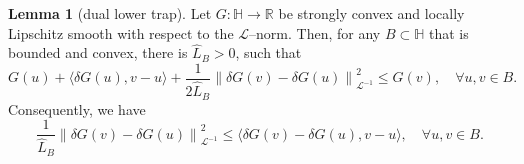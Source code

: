 \documentclass{amsart}
\newcommand{\dG}{{\delta G}}
\newcommand{\LL}{\mathcal{L}}
\newcommand{\LLinv}{{\mathcal{L}^{-1}}}
\newcommand{\norm}[2]{\left\| #1 \right\| _{#2}}
\newcommand{\pairing}[2]{\bigl\langle #1 , #2 \bigr\rangle}
\newcommand{\HH}{\mathbb{H}}
\newcommand{\RR}{\mathbb{R}}
\theoremstyle{definition}
\newtheorem{lem}[thm]{Lemma}
\begin{document}
	\begin{lem}[dual lower trap]
	\label{lem:dual-est-llip}
Let $G:\HH\to\RR$ be strongly convex and locally Lipschitz smooth with respect to the $\LL$--norm. Then, for any $B\subset \HH$ that is bounded and convex, there is $\hat L_B>0$, such that
	\begin{equation}\label{est:dream-prelim}
		G(u) +\pairing{\dG(u)}{v-u} +\frac{1}{2\hat L_B} \norm{\dG(v)-\dG(u)}{\LLinv}^2 \le G(v), \quad \forall u,v\in B.
	\end{equation}
	Consequently, we have
	\begin{equation}\label{est:dual-lip}
		\frac{1}{\hat L_B}\norm{\delta G(v)-\delta G(u)}{\LLinv}^2 \le \pairing{\delta G(v)-\delta G(u)}{v-u}, \quad \forall u,v\in B.
	\end{equation}	
\end{lem}
\end{document}
